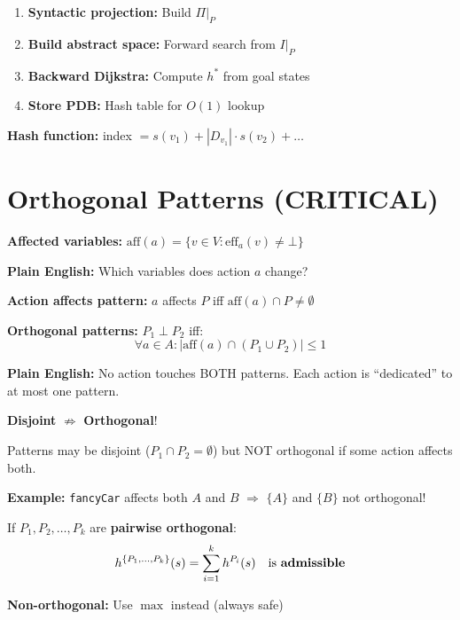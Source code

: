 \documentclass[11pt,a4paper]{article}
\begin{document}
\begin{examplebox}
\begin{enumerate}[leftmargin=*,nosep]
\item \textbf{Syntactic projection:} Build $\Pi|_P$
\item \textbf{Build abstract space:} Forward search from $I|_P$
\item \textbf{Backward Dijkstra:} Compute $h^*$ from goal states
\item \textbf{Store PDB:} Hash table for $O(1)$ lookup
\end{enumerate}

\textbf{Hash function:} index $= s(v_1) + |D_{v_1}| \cdot s(v_2) + \ldots$
\end{examplebox}

\section{Orthogonal Patterns (CRITICAL)}

\begin{definitionbox}
\textbf{Affected variables:} $\text{aff}(a) = \{v \in V : \text{eff}_a(v) \neq \bot\}$

\textbf{Plain English:} Which variables does action $a$ change?

\textbf{Action affects pattern:} $a$ affects $P$ iff $\text{aff}(a) \cap P \neq \emptyset$

\textbf{Orthogonal patterns:} $P_1 \perp P_2$ iff:
\[\forall a \in A: |\text{aff}(a) \cap (P_1 \cup P_2)| \leq 1\]

\textbf{Plain English:} No action touches BOTH patterns. Each action is ``dedicated'' to at most one pattern.
\end{definitionbox}

\begin{warningbox}
\textbf{Disjoint} $\not\Rightarrow$ \textbf{Orthogonal}!

Patterns may be disjoint ($P_1 \cap P_2 = \emptyset$) but NOT orthogonal if some action affects both.

\textbf{Example:} \texttt{fancyCar} affects both $A$ and $B$ $\Rightarrow$ $\{A\}$ and $\{B\}$ not orthogonal!
\end{warningbox}

\begin{definitionbox}
If $P_1, P_2, \ldots, P_k$ are \textbf{pairwise orthogonal}:
\[h^{\{P_1, \ldots, P_k\}}(s) = \sum_{i=1}^k h^{P_i}(s) \quad \text{is \textbf{admissible}}\]

\textbf{Non-orthogonal:} Use $\max$ instead (always safe)
\end{definitionbox}
\end{document}
